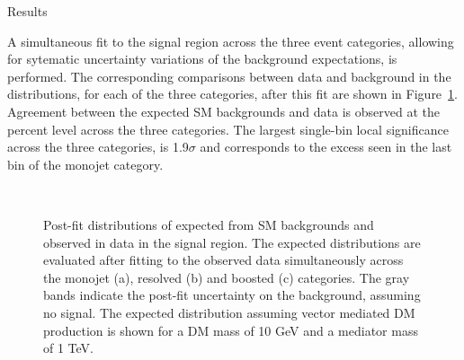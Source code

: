 \begin{section}{Results}

A simultaneous fit to the signal region across the three event categories, allowing for sytematic uncertainty variations of the background expectations, is performed.
The corresponding comparisons between data and background in the \ETm distributions, for each of the three categories, after this fit are shown in Figure~\ref{fig:post_fit_plots}.   
Agreement between the expected SM backgrounds and data is observed at the percent level across the three categories. The largest single-bin local significance across the three categories, is 1.9$\sigma$ and corresponds to the excess seen in the last \ETm bin of the monojet category.

\begin{figure}[hbtp]\begin{center}
  \\
 \caption{
   Post-fit distributions of \ETm expected from SM backgrounds and observed in data in the signal region. The expected distributions are 
   evaluated after fitting to the observed data simultaneously across the monojet (a), resolved (b) and boosted (c) categories. 
   The gray bands indicate the post-fit uncertainty on the background, assuming no signal. The expected distribution assuming vector mediated DM production 
   is shown for a DM mass of 10 GeV and a mediator mass of 1 TeV.
 }
 \label{fig:post_fit_plots}\end{center}\end{figure}


\end{section}
